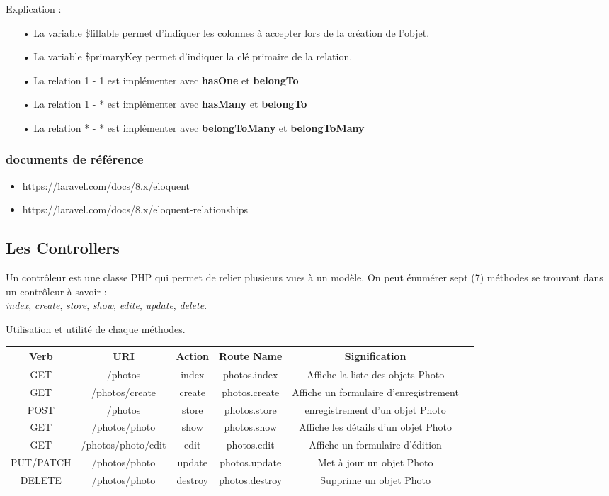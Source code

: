 \documentclass[12pt,a4paper]{article}
\begin{document}
Explication :\\
\begin{itemize}
\item[•] La variable \$fillable permet d'indiquer les colonnes à accepter lors de la création
de l'objet.
\item[•] La variable \$primaryKey permet d'indiquer la clé primaire de la relation.
\item[•] La relation  1 - 1 est implémenter avec \textbf{hasOne} et \textbf{belongTo}
\item[•] La relation  1 - * est implémenter avec \textbf{hasMany} et \textbf{belongTo}
\item[•] La relation  * - * est implémenter avec \textbf{belongToMany} et \textbf{belongToMany}
\end{itemize}
\subsubsection{documents de référence}
\begin{itemize}
\item https://laravel.com/docs/8.x/eloquent
\item https://laravel.com/docs/8.x/eloquent-relationships
\end{itemize}


\subsection{Les Controllers}
Un contrôleur est une classe PHP qui permet de relier plusieurs vues à un modèle. On peut énumérer
sept (7) méthodes se trouvant dans un contrôleur à savoir : \\
\textit{index}, \textit{create}, \textit{store}, \textit{show}, \textit{edite}, \textit{update}, \textit{delete}.\par
Utilisation et utilité de chaque méthodes.\\

\begin{center}
\begin{tabular}{|c|c|c|c|c|c|}
\hline 
Verb & URI & Action & Route Name & Signification \\ 
\hline 
GET & /photos & index & photos.index & Affiche la liste des objets Photo \\ 
\hline 
GET & /photos/create & create & photos.create & Affiche un formulaire d'enregistrement \\ 
\hline 
POST & /photos & store & photos.store & enregistrement d'un objet Photo\\ 
\hline 
GET & /photos/{photo} & show & photos.show & Affiche les détails d'un objet Photo \\ 
\hline 
GET & /photos/{photo}/edit & edit & photos.edit & Affiche un formulaire d'édition \\ 
\hline 
PUT/PATCH & /photos/{photo} & update & photos.update & Met à jour un objet Photo \\ 
\hline 
DELETE & /photos/{photo} & destroy & photos.destroy & Supprime un objet Photo \\ 
\hline 
\end{tabular} 
\end{center}
\end{document}
